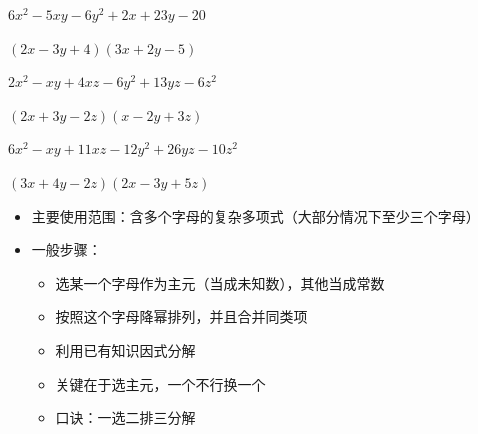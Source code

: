 \documentclass[windows,csize4]{BHCexam}
\begin{document}
\begin{groups}
\begin{questions}[]
\begin{multicols}{2}
            \question[5]$6x^2-5xy-6y^2+2x+23y-20$
            \begin{solution}{0.5cm}
                \methodonly $(2x-3y+4)(3x+2y-5)$
            \end{solution}
        \end{multicols}
        \vspace{3.5cm}

        \begin{multicols}{2}
            \question[5]$2 x^2-x y+4 x z-6 y^2+13 y z-6 z^2$
            \begin{solution}{0.5cm}
                \methodonly $(2 x+3 y-2 z) (x-2 y+3 z)$
            \end{solution}

            \question[5]$6 x^2-x y+11 x z-12 y^2+26 y z-10 z^2$
            \begin{solution}{0.5cm}
                \methodonly $(3 x+4 y-2 z) (2 x-3 y+5 z)$
            \end{solution}
        \end{multicols}
        \vspace{3.5cm}

    \end{questions}
\end{groups}

\begin{groups}
    \begin{itemize}
        \item 主要使用范围：含多个字母的复杂多项式（大部分情况下至少三个字母）
        \item 一般步骤：
              \begin{itemize}
                  \item 选某一个字母作为主元（当成未知数），其他当成常数
                  \item 按照这个字母降幂排列，并且合并同类项
                  \item 利用已有知识因式分解
                  \item 关键在于选主元，一个不行换一个
                  \item 口诀：一选二排三分解
              \end{itemize}
    \end{itemize}
\end{groups}
\end{document}
